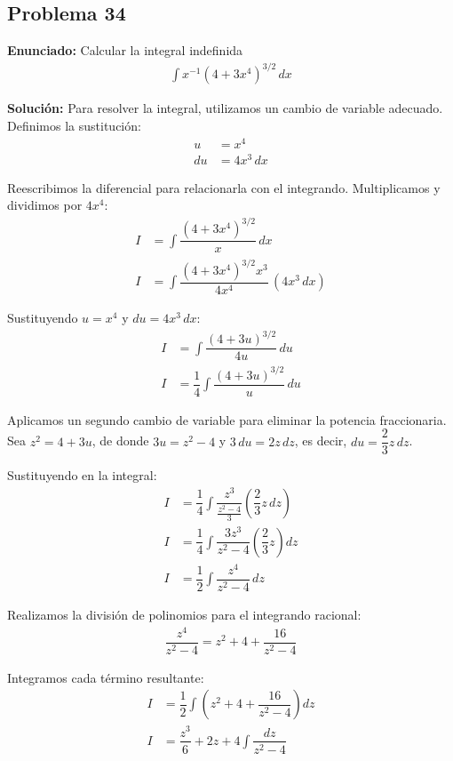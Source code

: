 \subsection*{Problema 34}
\textbf{Enunciado:} Calcular la integral indefinida
\begin{align*}
\int x^{-1} (4 + 3x^4)^{3/2} \, dx
\end{align*}

\textbf{Solución:} Para resolver la integral, 
utilizamos un cambio de variable adecuado. 
Definimos la sustitución:
\begin{align*}
u &= x^4 \\
du &= 4x^3 \, dx
\end{align*}

Reescribimos la diferencial para 
relacionarla con el integrando. 
Multiplicamos y dividimos por $4x^4$:
\begin{align*}
I &= \int \dfrac{(4 + 3x^4)^{3/2}}{x} \, dx \\
I &= \int \dfrac{(4 + 3x^4)^{3/2} x^3}{4x^4} \, (4x^3 \, dx)
\end{align*}

Sustituyendo $u = x^4$ y $du = 4x^3 \, dx$:
\begin{align*}
I &= \int \dfrac{(4 + 3u)^{3/2}}{4u} \, du \\
I &= \dfrac{1}{4} \int \dfrac{(4 + 3u)^{3/2}}{u} \, du
\end{align*}

Aplicamos un segundo cambio de variable 
para eliminar la potencia fraccionaria. 
Sea $z^2 = 4 + 3u$, de donde $3u = z^2 - 4$ 
y $3 \, du = 2z \, dz$, es decir, 
$du = \dfrac{2}{3}z \, dz$.

Sustituyendo en la integral:
\begin{align*}
I &= \dfrac{1}{4} \int \dfrac{z^3}{\frac{z^2 - 4}{3}} \left(\dfrac{2}{3}z \, dz\right) \\
I &= \dfrac{1}{4} \int \dfrac{3z^3}{z^2 - 4} \left(\dfrac{2}{3}z\right) dz \\
I &= \dfrac{1}{2} \int \dfrac{z^4}{z^2 - 4} \, dz
\end{align*}

Realizamos la división de polinomios 
para el integrando racional:
\begin{align*}
\dfrac{z^4}{z^2 - 4} = z^2 + 4 + \dfrac{16}{z^2 - 4}
\end{align*}

Integramos cada término resultante:
\begin{align*}
I &= \dfrac{1}{2} \int \left( z^2 + 4 + \dfrac{16}{z^2 - 4} \right) dz \\
I &= \dfrac{z^3}{6} + 2z + 4 \int \dfrac{dz}{z^2 - 4}
\end{align*}

